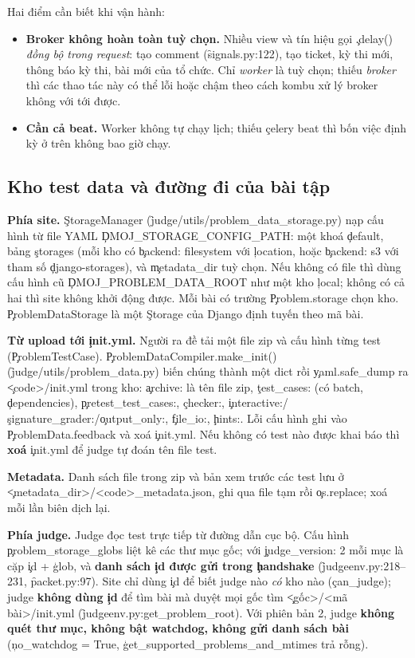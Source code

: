Hai điểm cần biết khi vận hành:
\begin{itemize}
\item \textbf{Broker không hoàn toàn tuỳ chọn.} Nhiều view và tín hiệu gọi \c{.delay()} \emph{đồng bộ trong request}: tạo comment (\f{signals.py:122}), tạo ticket, kỳ thi mới, thông báo kỳ thi, bài mới của tổ chức. Chỉ \emph{worker} là tuỳ chọn; thiếu \emph{broker} thì các thao tác này có thể lỗi hoặc chậm theo cách kombu xử lý broker không với tới được. \tI
\item \textbf{Cần cả beat.} Worker không tự chạy lịch; thiếu \c{celery beat} thì bốn việc định kỳ ở trên không bao giờ chạy. \tS
\end{itemize}

\subsection{Kho test data và đường đi của bài tập}\label{sec:storage}
\textbf{Phía site.} \c{StorageManager} (\f{judge/utils/problem_data_storage.py}) nạp cấu hình từ file YAML \c{DMOJ_STORAGE_CONFIG_PATH}: một khoá \c{default}, bảng \c{storages} (mỗi kho có \c{backend: filesystem} với \c{location}, hoặc \c{backend: s3} với tham số \c{django-storages}), và \c{metadata_dir} tuỳ chọn. Nếu không có file thì dùng cấu hình cũ \c{DMOJ_PROBLEM_DATA_ROOT} như một kho \c{local}; không có cả hai thì site không khởi động được. Mỗi bài có trường \c{Problem.storage} chọn kho. \c{ProblemDataStorage} là một \c{Storage} của Django định tuyến theo mã bài. \tS

\textbf{Từ upload tới \c{init.yml}.} Người ra đề tải một file zip và cấu hình từng test (\c{ProblemTestCase}). \c{ProblemDataCompiler.make_init()} (\f{judge/utils/problem_data.py}) biến chúng thành một dict rồi \c{yaml.safe_dump} ra \c{<code>/init.yml} trong kho: \c{archive:} là tên file zip, \c{test_cases:} (có batch, \c{dependencies}), \c{pretest_test_cases:}, \c{checker:}, \c{interactive:}/\c{signature_grader:}/\c{output_only:}, \c{file_io:}, \c{hints:}. Lỗi cấu hình ghi vào \c{ProblemData.feedback} và xoá \c{init.yml}. Nếu không có test nào được khai báo thì \textbf{xoá} \c{init.yml} để judge tự đoán tên file test. \tS

\textbf{Metadata.} Danh sách file trong zip và bản xem trước các test lưu ở \c{<metadata_dir>/<code>_metadata.json}, ghi qua file tạm rồi \c{os.replace}; xoá mỗi lần biên dịch lại. \tS

\textbf{Phía judge.} Judge đọc test trực tiếp từ đường dẫn cục bộ. Cấu hình \c{problem_storage_globs} liệt kê các thư mục gốc; với \c{judge_version: 2} mỗi mục là cặp \c{id} + \c{glob}, và \textbf{danh sách \c{id} được gửi trong \c{handshake}} (\f{judgeenv.py:218--231}, \f{packet.py:97}). Site chỉ dùng \c{id} để biết judge nào \emph{có} kho nào (\c{can_judge}); judge \textbf{không dùng \c{id}} để tìm bài mà duyệt mọi gốc tìm \c{<gốc>/<mã bài>/init.yml} (\f{judgeenv.py:get_problem_root}). Với phiên bản 2, judge \textbf{không quét thư mục, không bật watchdog, không gửi danh sách bài} (\c{no_watchdog = True}, \c{get_supported_problems_and_mtimes} trả rỗng). \tS

